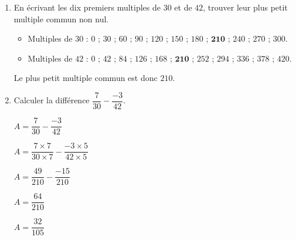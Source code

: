     \begin{enumerate}
        \item En écrivant les dix premiers multiples de $30$ et de $42$, trouver leur plus petit multiple commun non nul.

        \begin{itemize}
            \item Multiples de $30$ : $0$ ; $30$ ; $60$ ; $90$ ; $120$ ; $150$ ; $180$ ; $\mathbf{210}$ ; $240$ ; $270$ ; $300$.
            \item Multiples de $42$ : $0$ ; $42$ ; $84$ ; $126$ ; $168$ ; $\mathbf{210}$ ; $252$ ; $294$ ; $336$ ; $378$ ; $420$.
        \end{itemize}

        Le plus petit multiple commun est donc $210$.

        \smallskip
        \item Calculer la différence $\dfrac{7}{30}-\dfrac{-3}{42}$.

        \begin{spacing}{2}
            $A = \dfrac{7}{30}-\dfrac{-3}{42}$

            $A = \dfrac{7\times 7}{30\times 7}-\dfrac{-3\times 5}{42\times 5}$

            $A = \dfrac{49}{210}-\dfrac{-15}{210}$

            $A = \dfrac{64}{210}$

            $A = \dfrac{32}{105}$
        \end{spacing}
    \end{enumerate}

